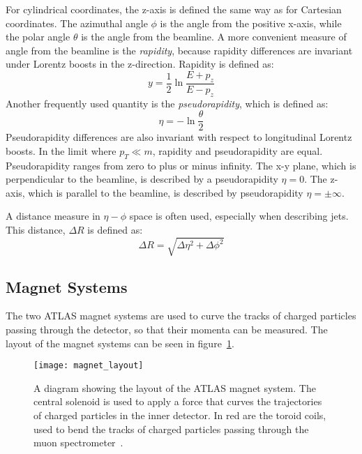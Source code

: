 For cylindrical coordinates, the z-axis is defined the same way as for Cartesian coordinates.
The azimuthal angle $\phi$ is the angle from the positive x-axis, while the polar angle $\theta$ is the angle from the beamline.
A more convenient measure of angle from the beamline is the \textit{rapidity}, because rapidity differences are invariant under Lorentz boosts in the z-direction.
Rapidity is defined as:
\begin{equation}
y = \frac{1}{2}\ln\frac{E+p_z}{E-p_z}
\end{equation}
Another frequently used quantity is the
\textit{pseudorapidity}, which is defined as:
\begin{equation}
\eta = -\ln\frac{\theta}{2}
\end{equation}
Pseudorapidity differences are also invariant with respect to longitudinal Lorentz boosts.
In the limit where $p_T \ll m$, rapidity and pseudorapidity are equal.
Pseudorapidity ranges from zero to plus or minus infinity.
The x-y plane, which is perpendicular to the beamline, is described by a pseudorapidity $\eta=0$.
The z-axis, which is parallel to the beamline, is described by pseudorapidity $\eta=\pm\infty$.

A distance measure in $\eta-\phi$ space is often used, especially when describing jets.
This distance, $\Delta R$ is defined as:
\begin{equation}
\Delta R = \sqrt{\Delta\eta^2+\Delta\phi^2}
\end{equation}

\subsection{Magnet Systems}\label{subsec:magnet_systems}
The two ATLAS magnet systems are used to curve the tracks of charged particles passing through the detector,
so that their momenta can be measured. The layout of the magnet systems can be seen in figure~\ref{fig:magnet_layout}.

\begin{figure}[!ht]\centering
\texttt{[image: magnet\_layout]}
\caption{A diagram showing the layout of the ATLAS magnet system.
The central solenoid is used to apply a force that curves the trajectories of charged particles in the inner detector.
In red are the toroid coils, used to bend the tracks of charged particles passing through the muon spectrometer~\cite{atlas-detector-2008}.}
\label{fig:magnet_layout}
\end{figure}

